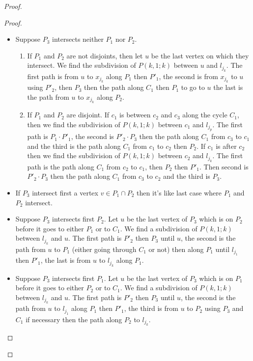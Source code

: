 \documentclass[10pt]{article}
\theoremstyle{plain}
\theoremstyle{definition}
\theoremstyle{remark}
\begin{document}
\begin{proof}
\begin{proof}
\begin{itemize}
	\item Suppose $P_3$ intersects neither $P_1$ nor $P_2$.
	\begin{enumerate}
		\item If $P_1$ and $P_2 $ are not disjoints, 
		then let $u$ be the last vertex on which they intersect. We find the subdivision of $P(k,1;k)$ between $u$ and $l_{j_k}$. 
		The first path is from $u$ to $x_{j_k}$ along $P_1$ then $P'_1$, the second is from $x_{j_k}$ to $u$ using $P'_2$, then $P_3$ then the path along $C_1$ 
		then $P_1$ to go to $u$ the last is the path from $u$ to $x_{j_k}$ along $P_2$.
		\item 	If $P_1$ and $P_2$ are disjoint. If $c_1$ is between $c_2$ and $c_3$ along the cycle $C_1$, then we find the subdivision of $P(k,1;k)$
		between $c_1$ and $l_{j_p}$. The first path is $P_1 \cdot P'_1$, the second is $P'_2 \cdot P_3$ 
		then the path along $C_1$ from $c_3$ to $c_1$ and the third
	is the path along $C_1$ from $c_1$ to $c_2$ then $P_2$. If $c_1$ is after $c_2$ then we find the subdivision of $P(k,1;k)$ between $c_2$ and 
	$l_{j_k} $. The first path is the path along $C_1$ from $c_2$ to $c_1$, then $P_2$ then $P'_1$. Then second is $P'_2 \cdot P_3$ then the path along $C_1$ from
	$c_3$ to $c_2$ and the third is $P_3$. 
\end{enumerate}
	\item If $P_3$ intersect first a vertex $v \in P_1 \cap P_2$ then it's like last case where $P_1$ and $P_2$ intersect.
	\item Suppose $P_3$ intersects first $P_2$. Let $u$ be the last vertex of $P_3$ which is on $P_2$ before it goes to either $P_1$ or to $C_1$.
	We find a subdivision of $P(k,1;k)$ between $l_{j_k}$ and $u$. The first path is $P'_2$ then $P_3$ until $u$, the second is the path from $u$ to $P_1$ (either going
	through $C_1$ or not) then along $P_1$ until $l_{j_1}$ then $P'_1$, the last is from $u$ to $l_{j_k}$ along $P_1$.
	\item Suppose $P_3$ intersects first $P_1$. Let $u$ be the last vertex of $P_3$ which is on $P_1$ before it goes to either $P_2$ or to $C_1$.
	We find a subdivision of $P(k,1;k)$ between $l_{j_k}$ and $u$. The first path is $P'_2$ then $P_3$ until $u$, the second is the path from $u$ to
	$l_{j_1}$ along $P_1$ then $P'_1$, the third is from $u$ to $P_2$ using $P_3$ and $C_1$ if necessary then the path along $P_2$ to  $l_{j_k}$.
\end{itemize} 



\end{proof}
\end{proof}
\end{document}
